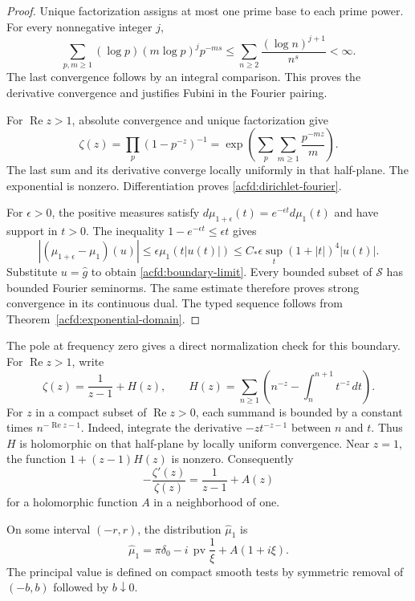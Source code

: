 \begin{proof}
Unique factorization assigns at most one prime base to each prime power.
For every nonnegative integer $j$,
\[
 \sum_{p,m\geq1}(\log p)(m\log p)^j p^{-ms}
       \leq\sum_{n\geq2}\frac{(\log n)^{j+1}}{n^s}<\infty.
\]
The last convergence follows by an integral comparison.
This proves the derivative convergence and justifies Fubini in the Fourier pairing.

For $\operatorname{Re}z>1$, absolute convergence and unique factorization give
\[
 \zeta(z)=\prod_p(1-p^{-z})^{-1}
     =\exp\left(\sum_p\sum_{m\geq1}\frac{p^{-mz}}m\right).
\]
The last sum and its derivative converge locally uniformly in that half-plane.
The exponential is nonzero.  Differentiation proves
\eqref{acfd:dirichlet-fourier}.

For $\epsilon>0$, the positive measures satisfy
$d\mu_{1+\epsilon}(t)=e^{-\epsilon t}d\mu_1(t)$ and have support in $t>0$.
The inequality $1-e^{-\epsilon t}\leq\epsilon t$ gives
\[
 |(\mu_{1+\epsilon}-\mu_1)(u)|
       \leq\epsilon\mu_1(t|u(t)|)
       \leq C_*\epsilon\sup_t(1+|t|)^4|u(t)|.
\]
Substitute $u=\widehat g$ to obtain \eqref{acfd:boundary-limit}.
Every bounded subset of $\mathcal S$ has bounded Fourier seminorms.
The same estimate therefore proves strong convergence in its continuous dual.
The typed sequence follows from Theorem~\ref{acfd:exponential-domain}.
\end{proof}

The pole at frequency zero gives a direct normalization check for this boundary.
For $\operatorname{Re}z>1$, write
\[
 \zeta(z)=\frac1{z-1}+H(z),\qquad
 H(z)=\sum_{n\geq1}
        \left(n^{-z}-\int_n^{n+1}t^{-z}\,dt\right).
\]
For $z$ in a compact subset of $\operatorname{Re}z>0$, each summand is
bounded by a constant times $n^{-\operatorname{Re}z-1}$.
Indeed, integrate the derivative $-zt^{-z-1}$ between $n$ and $t$.
Thus $H$ is holomorphic on that half-plane by locally uniform convergence.
Near $z=1$, the function $1+(z-1)H(z)$ is nonzero.  Consequently
\[
 -\frac{\zeta'(z)}{\zeta(z)}
       =\frac1{z-1}+A(z)
\]
for a holomorphic function $A$ in a neighborhood of one.

\begin{proposition}\label{acfd:pole-model}
On some interval $(-r,r)$, the distribution $\widehat\mu_1$ is
\begin{equation}\label{acfd:pole-sign}
 \widehat\mu_1
      =\pi\delta_0-i\,\operatorname{pv}\frac1\xi+A(1+i\xi).
\end{equation}
The principal value is defined on compact smooth tests by symmetric
removal of $(-b,b)$ followed by $b\downarrow0$.
\end{proposition}

